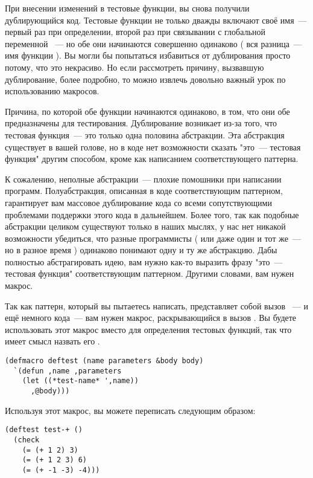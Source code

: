 При внесении изменений в тестовые функции, вы снова получили дублирующийся код. Тестовые
функции не только дважды включают своё имя~--- первый раз при определении, второй раз при
связывании с глобальной переменной ~--- но обе они начинаются совершенно
одинаково ( вся разница~--- имя функции ). Вы могли бы попытаться избавиться от
дублирования просто потому, что это некрасиво. Но если рассмотреть причину, вызвавшую
дублирование, более подробно, то можно извлечь довольно важный урок по использованию
макросов.

Причина, по которой обе функции начинаются одинаково, в том, что они обе предназначены для
тестирования. Дублирование возникает из-за того, что тестовая функция~--- это только одна
половина абстракции. Эта абстракция существует в вашей голове, но в коде нет возможности
сказать "это~--- тестовая функция" другим способом, кроме как написанием соответствующего
паттерна.

К сожалению, неполные абстракции~--- плохие помошники при написании
программ. Полуабстракция, описанная в коде соответствующим паттерном, гарантирует вам
массовое дублирование кода со всеми сопутствующими проблемами поддержки этого кода в
дальнейшем. Более того, так как подобные абстракции целиком существуют только в наших
мыслях, у нас нет никакой возможности убедиться, что разные программисты ( или даже один и
тот же~--- но в разное время ) одинаково понимают одну и ту же абстракцию. Дабы полностью
абстрагировать идею, вам нужно как-то выразить фразу "это~--- тестовая функция"
соответствующим паттерном. Другими словами, вам нужен макрос.

Так как паттерн, который вы пытаетесь написать, представляет собой вызов ~---
и ещё немного кода~--- вам нужен макрос, раскрывающийся в вызов . Вы будете
использовать этот макрос вместо  для определения тестовых функций, так что
имеет смысл назвать его .

\begin{lstlisting}
(defmacro deftest (name parameters &body body)
  `(defun ,name ,parameters
    (let ((*test-name* ',name))
      ,@body)))
\end{lstlisting}

Используя этот макрос, вы можете переписать  следующим образом:

\begin{lstlisting}
(deftest test-+ ()
  (check
    (= (+ 1 2) 3)
    (= (+ 1 2 3) 6)
    (= (+ -1 -3) -4)))
\end{lstlisting}

